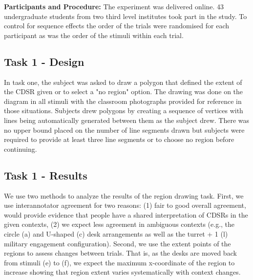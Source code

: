 \documentclass[11pt,letterpaper]{article}
\begin{document}
\textbf{Participants and Procedure:} The experiment was delivered online. 43 undergraduate students from two third level institutes took part in the study. To control for sequence effects the order of the trials were randomised for each participant as was the order of the stimuli within each trial.   

\subsection{Task 1 - Design}
In task one, the subject was asked to draw a polygon that defined the extent of the CDSR given or to select a "no region" option.  The drawing was done on the diagram in all stimuli with the classroom photographs provided for reference in those situations.  Subjects drew polygons by creating a sequence of vertices with lines being automatically generated between them as the subject drew.  There was no upper bound placed on the number of line segments drawn but subjects were required to provide at least three line segments or to choose no region before continuing.

\subsection{Task 1 - Results}
We use two methods to analyze the results of the region drawing task.  First, we use interannotator agreement for two reasons: (1) fair to good overall agreement, would provide evidence that people have a shared interpretation of CDSRs in the given contexts, (2) we expect less agreement in ambiguous contexts (e.g., the circle (a) and U-shaped (c) desk arrangements as well as the turret + 1 (l) military engagement configuration).  Second, we use the extent points of the regions to assess changes between trials.  That is, as the desks are moved back from stimuli (e) to (f), we expect the maximum x-coordinate of the region to increase showing that region extent varies systematically with context changes.

\end{document}
